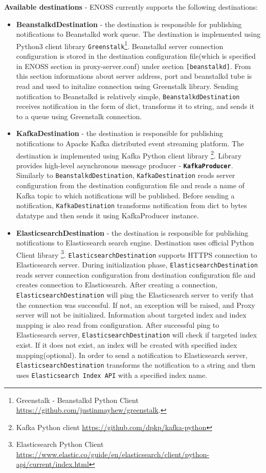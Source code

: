     \textbf{Available destinations} - ENOSS currently supports the following destinations:
    \begin{itemize}
        \item \textbf{BeanstalkdDestination} - the destination is responsible for publishing notifications to Beanstalkd work queue. The destination is implemented using Python3 client library \texttt{Greenstalk}\footnote{Greenstalk - Beanstalkd Python Client \url{https://github.com/justinmayhew/greenstalk}.}. Beanstalkd server connection configuration is stored in the destination configuration file(which is specified in ENOSS section in proxy-server.conf) under section \texttt{[beanstalkd]}. From this section informations about server address, port and beanstalkd tube is read and used to initalize connection using Greenstalk library. Sending notification to Beanstalkd is relatively simple, \texttt{BeanstalkdDestination} receives notification in the form of dict, transforms it to string, and sends it to a queue using Greenstalk connection.

        \item \textbf{KafkaDestination} - the destination is responsible for publishing notifications to Apacke Kafka distributed event streaming platform. The destination is implemented using Kafka Python client library \footnote{Kafka Python client \url{https://github.com/dpkp/kafka-python}}. Library provides high-level asynchronous message producer - \textbf{\texttt{KafkaProducer}}. Similarly to \texttt{BeanstalkdDestination}, \texttt{KafkaDestination} reads server configuration from the destination configuration file and reads a name of Kafka topic to which notifications will be published. Before sending a notification, \texttt{KafkaDestination} transforms notification from dict to bytes datatype and then sends it using KafkaProducer instance.

        \item \textbf{ElasticsearchDestination} - the destination is responsible for publishing notifications to Elasticsearch search engine. Destination uses official Python Client library \footnote{Elasticsearch Python Client \url{https://www.elastic.co/guide/en/elasticsearch/client/python-api/current/index.html}}. \texttt{ElasticsearchDestination} supports HTTPS connection to Elasticsearch server. During initialization phase, \texttt{ElasticsearchDestination} reads server connection configuration from destination configuration file and creates connection to Elasticsearch. After creating a connection, \texttt{ElasticsearchDestination} will ping the Elasticsearch server to verify that the connection was successful. If not, an exception will be raised, and Proxy server will not be initialized. Information about targeted index and index mapping is also read from configuration. After successful ping to Elasticsearch server, \texttt{ElasticsearchDestination} will check if targeted index exist. If it does not exist, an index will be created with specified index mapping(optional). In order to send a notification to Elasticsearch server, \texttt{ElasticsearchDestination} transforms the notification to a string and then uses \texttt{Elasticsearch Index API} with a specified index name.
    \end{itemize}

